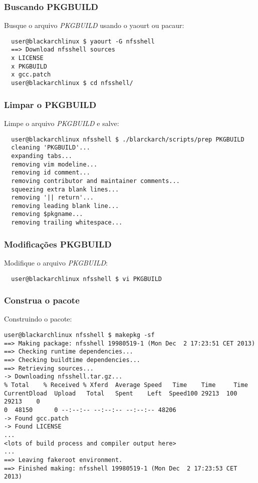 \documentclass[a4paper, oneside, 11pt]{book}
\begin{document}
\subsubsection{Buscando PKGBUILD}
Busque o arquivo \textit{PKGBUILD} usando o yaourt ou pacaur:
\begin{lstlisting}
  user@blackarchlinux $ yaourt -G nfsshell
  ==> Download nfsshell sources
  x LICENSE
  x PKGBUILD
  x gcc.patch
  user@blackarchlinux $ cd nfsshell/
\end{lstlisting}

\subsubsection{Limpar o PKGBUILD}
Limpe o arquivo \textit{PKGBUILD} e salve:
\begin{lstlisting}
  user@blackarchlinux nfsshell $ ./blarckarch/scripts/prep PKGBUILD
  cleaning 'PKGBUILD'...
  expanding tabs...
  removing vim modeline...
  removing id comment...
  removing contributor and maintainer comments...
  squeezing extra blank lines...
  removing '|| return'...
  removing leading blank line...
  removing $pkgname...
  removing trailing whitespace...
\end{lstlisting}

\subsubsection{Modificações PKGBUILD}
Modifique o arquivo \textit{PKGBUILD}:
\begin{lstlisting}
  user@blackarchlinux nfsshell $ vi PKGBUILD
\end{lstlisting}

\subsubsection{Construa o pacote}
Construindo o pacote:
\begin{lstlisting}user@blackarchlinux nfsshell $ makepkg -sf
==> Making package: nfsshell 19980519-1 (Mon Dec  2 17:23:51 CET 2013)
==> Checking runtime dependencies...
==> Checking buildtime dependencies...
==> Retrieving sources...
-> Downloading nfsshell.tar.gz...
% Total    % Received % Xferd  Average Speed   Time    Time     Time
CurrentDload  Upload   Total   Spent    Left  Speed100 29213  100 29213    0
0  48150      0 --:--:-- --:--:-- --:--:-- 48206
-> Found gcc.patch
-> Found LICENSE
...
<lots of build process and compiler output here>
...
==> Leaving fakeroot environment.
==> Finished making: nfsshell 19980519-1 (Mon Dec  2 17:23:53 CET 2013)
\end{lstlisting}
\end{document}

